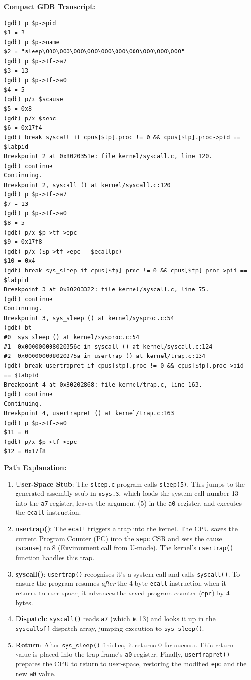 \documentclass[11pt,a4paper]{article}
\begin{document}
\textbf{Compact GDB Transcript:}
\begin{lstlisting}
(gdb) p $p->pid
$1 = 3
(gdb) p $p->name
$2 = "sleep\000\000\000\000\000\000\000\000\000\000"
(gdb) p $p->tf->a7
$3 = 13
(gdb) p $p->tf->a0
$4 = 5
(gdb) p/x $scause
$5 = 0x8
(gdb) p/x $sepc
$6 = 0x17f4
(gdb) break syscall if cpus[$tp].proc != 0 && cpus[$tp].proc->pid == $labpid
Breakpoint 2 at 0x8020351e: file kernel/syscall.c, line 120.
(gdb) continue
Continuing.
Breakpoint 2, syscall () at kernel/syscall.c:120
(gdb) p $p->tf->a7
$7 = 13
(gdb) p $p->tf->a0
$8 = 5
(gdb) p/x $p->tf->epc
$9 = 0x17f8
(gdb) p/x ($p->tf->epc - $ecallpc)
$10 = 0x4
(gdb) break sys_sleep if cpus[$tp].proc != 0 && cpus[$tp].proc->pid == $labpid
Breakpoint 3 at 0x80203322: file kernel/syscall.c, line 75.
(gdb) continue
Continuing.
Breakpoint 3, sys_sleep () at kernel/sysproc.c:54
(gdb) bt
#0  sys_sleep () at kernel/sysproc.c:54
#1  0x000000008020356c in syscall () at kernel/syscall.c:124
#2  0x000000008020275a in usertrap () at kernel/trap.c:134
(gdb) break usertrapret if cpus[$tp].proc != 0 && cpus[$tp].proc->pid == $labpid
Breakpoint 4 at 0x80202868: file kernel/trap.c, line 163.
(gdb) continue
Continuing.
Breakpoint 4, usertrapret () at kernel/trap.c:163
(gdb) p $p->tf->a0
$11 = 0
(gdb) p/x $p->tf->epc
$12 = 0x17f8
\end{lstlisting}

\textbf{Path Explanation:}
\begin{enumerate}
    \item \textbf{User-Space Stub}: The \texttt{sleep.c} program calls \texttt{sleep(5)}. This jumps to the generated assembly stub in \texttt{usys.S}, which loads the system call number 13 into the \texttt{a7} register, leaves the argument (5) in the \texttt{a0} register, and executes the \texttt{ecall} instruction.
    \item \textbf{usertrap()}: The \texttt{ecall} triggers a trap into the kernel. The CPU saves the current Program Counter (PC) into the \texttt{sepc} CSR and sets the cause (\texttt{scause}) to 8 (Environment call from U-mode). The kernel's \texttt{usertrap()} function handles this trap.
    \item \textbf{syscall()}: \texttt{usertrap()} recognises it's a system call and calls \texttt{syscall()}. To ensure the program resumes \textit{after} the 4-byte \texttt{ecall} instruction when it returns to user-space, it advances the saved program counter (\texttt{epc}) by 4 bytes. 
    \item \textbf{Dispatch}: \texttt{syscall()} reads \texttt{a7} (which is 13) and looks it up in the \texttt{syscalls[]} dispatch array, jumping execution to \texttt{sys\_sleep()}.
    \item \textbf{Return}: After \texttt{sys\_sleep()} finishes, it returns 0 for success. This return value is placed into the trap frame's \texttt{a0} register. Finally, \texttt{usertrapret()} prepares the CPU to return to user-space, restoring the modified \texttt{epc} and the new \texttt{a0} value.
\end{enumerate}
\end{document}
